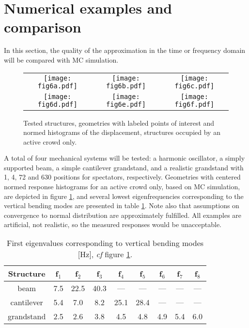 \documentclass[preprint,12pt,authoryear]{elsarticle}
\begin{document}
\section{Numerical examples and comparison}
\label{examples}
In this section, the quality of the approximation in the time or frequency domain will be compared with MC simulation.
\begin{figure}
	\centering
	\begin{tabular}{ccc}
  \texttt{[image: fig6a.pdf]} &
  \texttt{[image: fig6b.pdf]} &
  \texttt{[image: fig6c.pdf]} \\
  \texttt{[image: fig6d.pdf]} &
  \texttt{[image: fig6e.pdf]} &
  \texttt{[image: fig6f.pdf]}
  \end{tabular}
	\caption{Tested structures, geometries with labeled points of interest and normed histograms of the displacement, structures occupied by an active crowd only.}
	\label{4fig1}
\end{figure}
A total of four mechanical systems will be tested: a harmonic oscillator, a simply supported beam, a simple cantilever grandstand, and a realistic grandstand with 1, 4, 72 and 630 positions for spectators, respectively. Geometries with centered normed response histograms for an active crowd only, based on MC simulation, are depicted in figure \ref{4fig1}, and several lowest eigenfrequencies corresponding to the vertical bending modes are presented in table \ref{4tab1}. Note also that assumptions on convergence to normal distribution are approximately fulfilled. All examples are artificial, not realistic, so the measured responses would be unacceptable. 
\begin{table}
	\centering
	\caption{First eigenvalues corresponding to vertical bending modes [Hz], \textit{cf} figure \ref{4fig1}.}
	\begin{tabular}{|c|c|c|c|c|c|c|c|c|}
		\hline
		Structure & f$_1$ & f$_2$ & f$_3$ & f$_4$ & f$_5$  & f$_6$ & f$_7$ & f$_8$ \\\hline
		beam & 7.5 & 22.5 & 40.3 & --- & --- & --- & --- & --- \\
		cantilever & 5.4 & 7.0 & 8.2 & 25.1 & 28.4 & --- & --- & --- \\
		grandstand & 2.5 & 2.6 & 3.8 & 4.5 & 4.8 & 4.9 & 5.4 & 6.0 \\\hline
	\end{tabular}
	\label{4tab1}
\end{table}
\end{document}
